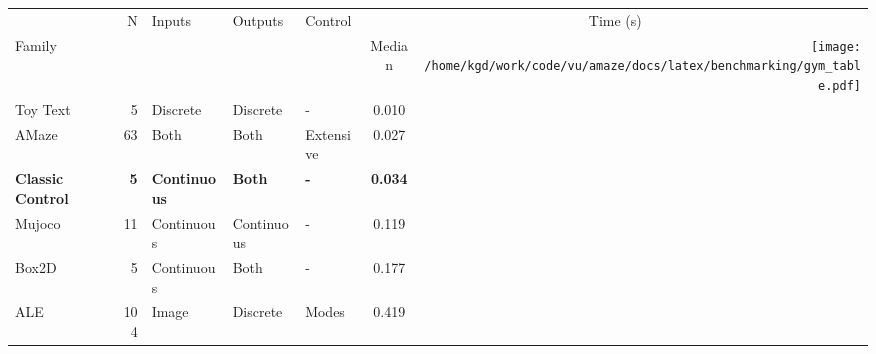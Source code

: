 \documentclass{standalone}
\begin{document}
\newlength{\img}%
\setlength{\img}{7.2\baselineskip}%
\begin{tabular}{lrlllc@{ }r@{}}
\toprule
 &\multirow{2}{*}{ N }&\multirow{2}{*}{ Inputs }&\multirow{2}{*}{ Outputs }&\multirow{2}{*}{ Control }& \multicolumn{2}{c}{Time (s)} \\ 
\cmidrule(lr){6-7}
Family &  &  &  &  & Median & \multirow{7.77}{*}{\texttt{[image: /home/kgd/work/code/vu/amaze/docs/latex/benchmarking/gym\_table.pdf]}} \\
\cmidrule(r){1-6}
Toy Text & 5 & Discrete & Discrete & - & 0.010 \\
AMaze & 63 & Both & Both & Extensive & 0.027 \\
\textbf{Classic Control} & \textbf{5} & \textbf{Continuous} & \textbf{Both} & \textbf{-} & \textbf{0.034 }\\
Mujoco & 11 & Continuous & Continuous & - & 0.119 \\
Box2D & 5 & Continuous & Both & - & 0.177 \\
ALE & 104 & Image & Discrete & Modes & 0.419 \\
\bottomrule
\end{tabular}
\end{document}
